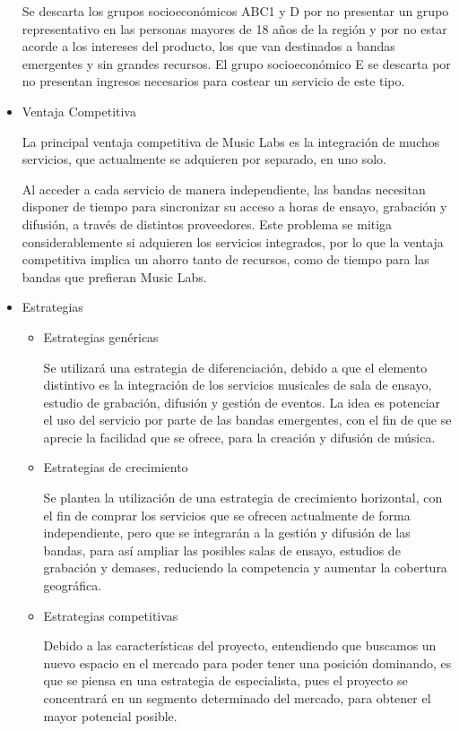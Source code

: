 \begin{itemize}
Se descarta los grupos socioeconómicos ABC1 y D por no presentar un grupo representativo
en las personas mayores de 18 años de la región y por no estar acorde
a los intereses del producto, los que van destinados a bandas emergentes
y sin grandes recursos. El grupo socioeconómico E se descarta por 
no presentan ingresos necesarios para costear un servicio de este tipo.

\item{Ventaja Competitiva}

La principal ventaja competitiva de Music Labs es la integración de muchos servicios, 
que actualmente se adquieren por separado, en uno solo. 

 Al acceder a cada servicio de manera independiente, las bandas necesitan disponer de tiempo para sincronizar
su acceso a horas de ensayo, grabación y difusión, a través de distintos proveedores. Este problema se
mitiga considerablemente si adquieren los servicios integrados, por lo que la ventaja
competitiva implica un ahorro tanto de recursos, como de tiempo para las bandas que prefieran Music Labs.


\item{Estrategias}

\begin{itemize}
\item Estrategias genéricas

Se utilizará una estrategia de diferenciación, debido a que el elemento 
distintivo es la integración de los servicios musicales de sala de ensayo, 
estudio de grabación, difusión y gestión de eventos. La idea es potenciar el uso 
del servicio por parte de las bandas emergentes, con el fin de que se aprecie la 
facilidad que se ofrece, para la creación y difusión de música.

\item Estrategias de crecimiento

Se plantea la utilización de una estrategia de crecimiento horizontal, con 
el fin de comprar los servicios que se ofrecen actualmente de forma independiente,
 pero que se integrarán a la gestión y difusión de las bandas, para así ampliar 
las posibles salas de ensayo, estudios de grabación y demases, reduciendo la
 competencia y aumentar la cobertura geográfica.

\item Estrategias competitivas

Debido a las características del proyecto, entendiendo que buscamos un nuevo espacio
en el mercado para poder tener una posición dominando, es que se piensa en una estrategia
de especialista, pues el proyecto se concentrará en un segmento determinado del mercado,
para obtener el mayor potencial posible.


\end{itemize}
\end{itemize}
